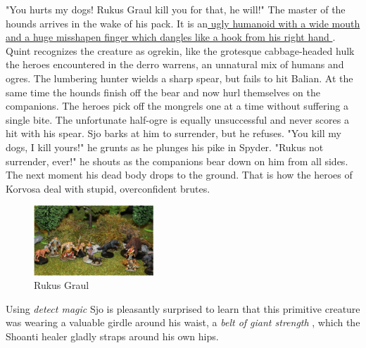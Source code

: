 "You hurts my dogs! Rukus Graul kill you for that, he will!" The master of the hounds arrives in the wake of his pack. It is an\hyperref[fig:Rukus-Graul-504564975]{ ugly humanoid with a wide mouth and a huge misshapen finger which dangles like a hook from his right hand } . Quint recognizes the creature as ogrekin, like the grotesque cabbage-headed hulk the heroes encountered in the derro warrens, an unnatural mix of humans and ogres. The lumbering hunter wields a sharp spear, but fails to hit Balian. At the same time the hounds finish off the bear and now hurl themselves on the companions. The heroes pick off the mongrels one at a time without suffering a single bite. The unfortunate half-ogre is equally unsuccessful and never scores a hit with his spear. Sjo barks at him to surrender, but he refuses. "You kill my dogs, I kill yours!" he grunts as he plunges his pike in Spyder. "Rukus not surrender, ever!" he shouts as the companions bear down on him from all sides. The next moment his dead body drops to the ground. That is how the heroes of Korvosa deal with stupid, overconfident brutes. \\

\begin{figure}[h]
	\centering
	\includegraphics[width=0.4\textwidth]{images/Rukus-Graul-504564975_mod.jpg}
	\caption{Rukus Graul}
	\label{fig:Rukus-Graul-504564975}
\end{figure}

Using {\itshape detect magic} Sjo is pleasantly surprised to learn that this primitive creature was wearing a valuable girdle around his waist, a  {\itshape belt of giant strength} , which the Shoanti healer gladly straps around his own hips. 